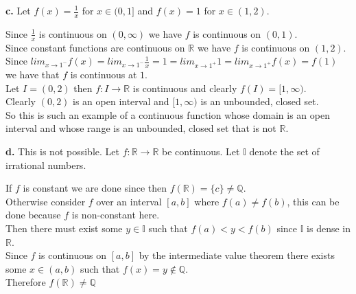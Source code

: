 \documentclass{article}
\begin{document}
{\Large\textbf{c.}} Let $f(x) =\frac{1}{x}$ for $x\in(0,1]$ and $f(x) = 1$ for $x\in (1,2)$.
\begin{center}
    \doublespacing
    Since $\frac{1}{x}$ is continuous on $(0,\infty )$ we have $f$ is continuous on $(0, 1)$.
    \\Since constant functions are continuous on $\mathbb{R}$ we have $f$ is continuous on $(1, 2)$.
    \\Since $lim _{x\rightarrow {1}^-} f(x) = lim _{x\rightarrow {1}^-}\frac{1}{x} = 1 = lim_{x\rightarrow {1}^+} 1 = lim_{x\rightarrow {1}^+} f(x) = f(1)$ we have that $f$ is continuous at $1$.
    \\Let $I = (0, 2)$ then $f: I\rightarrow\mathbb{R}$ is continuous and clearly $f(I) = [1, \infty )$.
    \\Clearly $(0, 2)$ is an open interval and $[1,\infty )$ is an unbounded, closed set.
    \\So this is such an example of a continuous function whose domain is an open interval and whose range is an unbounded, closed set that is not $\mathbb{R}$.
\end{center}

{\Large\textbf{d.}} This is not possible. Let $f:\mathbb{R}\rightarrow\mathbb{R}$ be continuous. Let $\mathbb{I}$ denote the set of irrational numbers.
\begin{center}
    \doublespacing
    If $f$ is constant we are done since then $f(\mathbb{R}) =\{c\}\neq\mathbb{Q}$.
    \\Otherwise consider $f$ over an interval $[a, b]$ where $f(a)\neq f(b)$, this can be done because $f$ is non-constant here.
    \\Then there must exist some $y\in\mathbb{I}$ such that $f(a) < y < f(b)$ since $\mathbb{I}$ is dense in $\mathbb{R}$.
    \\Since $f$ is continuous on $[a, b]$ by the intermediate value theorem there exists some $x\in (a, b)$ such that $f(x) = y\notin\mathbb{Q}$.
    \\Therefore $f(\mathbb{R})\neq\mathbb{Q}$ \qedsymbol
\end{center}


\newpage
\end{document}
